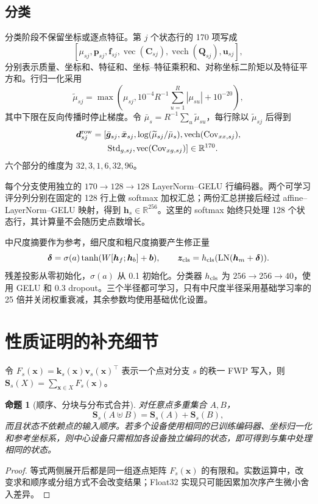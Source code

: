 \documentclass[UTF8,a4paper,11pt,fontset=windows]{ctexart}
\newtheorem{proposition}{命题}
\newcommand{\R}{\mathbb{R}}
\newcommand{\Sstate}{\mathbf{S}}
\newcommand{\vect}{\operatorname{vec}}
\begin{document}
\subsection{分类}

分类阶段不保留坐标或逐点特征。第 $j$ 个状态行的 170 项写成
\[
[\mu_{sj},\bm p_{sj},\bm f_{sj},\vect(\bm C_{sj}),
\operatorname{vech}(\bm Q_{sj}),\bm u_{sj}],
\]
分别表示质量、坐标和、特征和、坐标--特征乘积和、对称坐标二阶矩以及特征平方和。行归一化采用
\begin{equation}
\widetilde\mu_{sj}=\max\!\left(
\mu_{sj},10^{-4}R^{-1}\sum_{u=1}^{R}|\mu_{su}|+10^{-20}\right),
\label{eq:cls-floor-cn}
\end{equation}
其中下限在反向传播时停止梯度。令 $\bar\mu_s=R^{-1}\sum_u\widetilde\mu_{su}$，每行除以 $\widetilde\mu_{sj}$ 后得到
\begin{equation}
\begin{aligned}
\bm d^{\rm row}_{sj}=[&
\bar{\bm g}_{sj},\bar{\bm x}_{sj},
\log(\widetilde\mu_{sj}/\bar\mu_s),
\operatorname{vech}(\operatorname{Cov}_{xx,sj}),\\
&\operatorname{Std}_{g,sj},
\vect(\operatorname{Cov}_{xg,sj})]\in\R^{170}.
\end{aligned}
\label{eq:cls-descriptor-cn}
\end{equation}
六个部分的维度为 $32,3,1,6,32,96$。

每个分支使用独立的 $170\rightarrow128\rightarrow128$ LayerNorm--GELU 行编码器。两个可学习评分列分别在固定的 128 行上做 softmax 加权汇总；两份汇总拼接后经过 affine--LayerNorm--GELU 映射，得到 $\bm h_s\in\R^{256}$。这里的 softmax 始终只处理 128 个状态行，其计算量不会随历史点数增长。

中尺度摘要作为参考，细尺度和粗尺度摘要产生修正量
\[
\bm\delta=\sigma(a)\tanh(W[\bm h_f;\bm h_b]+\bm b),\qquad
\bm z_{\rm cls}=h_{\rm cls}(\operatorname{LN}(\bm h_m+\bm\delta)).
\]
残差投影从零初始化，$\sigma(a)$ 从 0.1 初始化。分类器 $h_{\rm cls}$ 为 $256\rightarrow256\rightarrow40$，使用 GELU 和 0.3 dropout。三个半径都可学习，只有中尺度半径采用基础学习率的 25 倍并关闭权重衰减，其余参数均使用基础优化设置。

\section{性质证明的补充细节}

令 $F_s(\bm x)=\bm k_s(\bm x)\bm v_s(\bm x)^\top$ 表示一个点对分支 $s$ 的秩一 FWP 写入，则 $\Sstate_s(X)=\sum_{\bm x\in X}F_s(\bm x)$。

\begin{proposition}[顺序、分块与分布式合并]
对任意点多重集合 $A,B$，
\[
\Sstate_s(A\uplus B)=\Sstate_s(A)+\Sstate_s(B),
\]
而且状态不依赖点的输入顺序。若多个设备使用相同的已训练编码器、坐标归一化和参考坐标系，则中心设备只需相加各设备独立编码的状态，即可得到与集中处理相同的状态。
\end{proposition}
\begin{proof}
等式两侧展开后都是同一组逐点矩阵 $F_s(\bm x)$ 的有限和。实数运算中，改变求和顺序或分组方式不会改变结果；Float32 实现只可能因累加次序产生微小舍入差异。
\end{proof}
\end{document}
